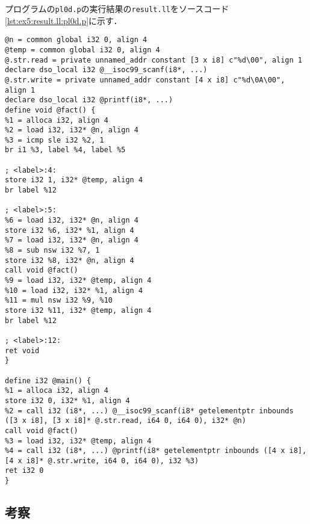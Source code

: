 \documentclass[uplatex]{jsarticle}
\begin{document}
プログラムの\verb#pl0d.p#の実行結果の\verb#result.ll#をソースコード\ref{lst:ex5:result.ll:pl0d.p}に示す．
\begin{lstlisting}[caption=condition句の処理,label=lst:ex5:result.ll:pl0d.p]
@n = common global i32 0, align 4
@temp = common global i32 0, align 4
@.str.read = private unnamed_addr constant [3 x i8] c"%d\00", align 1
declare dso_local i32 @__isoc99_scanf(i8*, ...)
@.str.write = private unnamed_addr constant [4 x i8] c"%d\0A\00", align 1
declare dso_local i32 @printf(i8*, ...)
define void @fact() {
%1 = alloca i32, align 4
%2 = load i32, i32* @n, align 4
%3 = icmp sle i32 %2, 1
br i1 %3, label %4, label %5

; <label>:4:
store i32 1, i32* @temp, align 4
br label %12

; <label>:5:
%6 = load i32, i32* @n, align 4
store i32 %6, i32* %1, align 4
%7 = load i32, i32* @n, align 4
%8 = sub nsw i32 %7, 1
store i32 %8, i32* @n, align 4
call void @fact()
%9 = load i32, i32* @temp, align 4
%10 = load i32, i32* %1, align 4
%11 = mul nsw i32 %9, %10
store i32 %11, i32* @temp, align 4
br label %12

; <label>:12:
ret void
}

define i32 @main() {
%1 = alloca i32, align 4
store i32 0, i32* %1, align 4
%2 = call i32 (i8*, ...) @__isoc99_scanf(i8* getelementptr inbounds ([3 x i8], [3 x i8]* @.str.read, i64 0, i64 0), i32* @n)
call void @fact()
%3 = load i32, i32* @temp, align 4
%4 = call i32 (i8*, ...) @printf(i8* getelementptr inbounds ([4 x i8], [4 x i8]* @.str.write, i64 0, i64 0), i32 %3)
ret i32 0
}
\end{lstlisting}
\subsection{考察}
\end{document}
